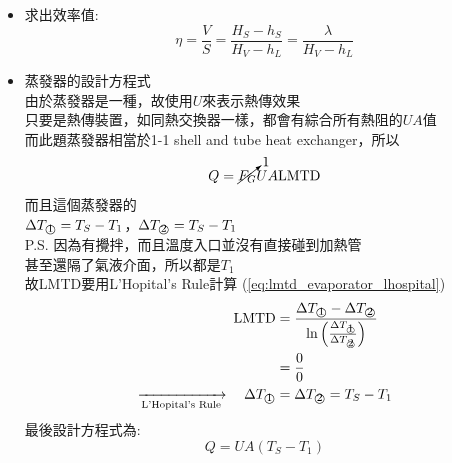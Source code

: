 \documentclass[../main.tex]{subfiles}
\begin{document}
\begin{itemize}
\begin{enumerate}
\begin{itemize}
\begin{equation}
      \end{equation}
      解得:
      \begin{equation}
        F h_F + S(H_S - h_S) = L h_L + V H_V
      \end{equation}
      定義$\lambda$為蒸氣的潛熱
      \begin{equation}
        \lambda = H_S -h_S
      \end{equation}
      代入上式得:
      \begin{equation}
        F h_F + S\cdot \lambda = L h_L + V H_V
      \end{equation}
      \item 求出效率值:
      \begin{equation}
        \eta = \frac{V}{S} = \frac{H_S - h_S}{H_V - h_L} = \frac{\lambda}{H_V - h_L}
      \end{equation}
      \item 蒸發器的設計方程式\\
      由於蒸發器是一種，故使用$U$來表示熱傳效果\\
      只要是熱傳裝置，如同熱交換器一樣，都會有綜合所有熱阻的$UA$值\\
      而此題蒸發器相當於1-1 shell and tube heat exchanger，所以
      \begin{equation}
        Q = \cancelto{1}{F_G} UA\text{LMTD}
      \end{equation}
      而且這個蒸發器的\\
      $\Delta T_{\text{\textcircled{\footnotesize 1}}} = T_S - T_1$，$\Delta T_{\text{\textcircled{\footnotesize 2}}} = T_S - T_1$\\
      P.S. 因為有攪拌，而且溫度入口並沒有直接碰到加熱管\\
      甚至還隔了氣液介面，所以都是$T_1$\\
      故LMTD要用L'Hopital's Rule計算 (\ref{eq:lmtd_evaporator_lhospital})
      \begin{align}
        \text{LMTD} &= \frac{\Delta T_{\text{\textcircled{\footnotesize 1}}}-\Delta T_{\text{\textcircled{\footnotesize 2}}}}
        {\ln\left(\frac{\Delta T_{\text{\textcircled{\footnotesize 1}}}}{\Delta T_{\text{\textcircled{\footnotesize 2}}}}\right)} \nonumber\\
        &=\frac{0}{0}\nonumber\\
        \xrightarrow[\text{L'Hopital's Rule}]{} \quad \Delta T_{\text{\textcircled{\footnotesize 1}}} &= \Delta T_{\text{\textcircled{\footnotesize 2}}} = T_S - T_1
      \end{align}
      最後設計方程式為:
      \begin{equation}
        Q = UA (T_S - T_1)
      \end{equation}
    \end{itemize}

\end{enumerate}
\end{itemize}
\end{document}
